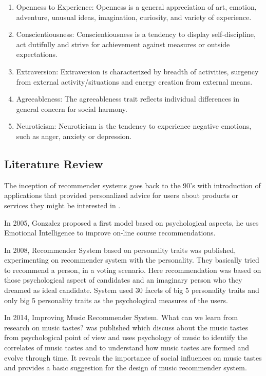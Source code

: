 \documentclass[conference]{IEEEtran}
\begin{document}
\begin{enumerate}
\item Openness to Experience: Openness is a general appreciation of art, emotion, adventure, unusual ideas, imagination, curiosity, and variety of experience.
\item Conscientiousness: Conscientiousness is a tendency to display self-discipline, act dutifully and strive for achievement against measures or outside expectations.
\item Extraversion: Extraversion is characterized by breadth of activities, surgency from external activity/situations and energy creation from external means.
\item Agreeableness: The agreeableness trait reflects individual differences in general concern for social harmony.
\item Neuroticism: Neuroticism is the tendency to experience negative emotions, such as anger, anxiety or depression.
\end{enumerate}

\subsection{Literature Review}
The inception of recommender systems goes back to the 90's with introduction of applications that provided personalized advice for users about products or services they might be interested in \cite{resnick}.

In 2005, Gonzalez \cite{gonzalez} proposed a first model based on psychological aspects, he uses Emotional Intelligence to improve on-line course recommendations.

In 2008, Recommender System based on personality traits \cite{nunes} was published, experimenting on recommender system with the personality. They basically tried to recommend a person, in a voting scenario. Here recommendation was based on those psychological aspect of candidates and an imaginary person who they dreamed as ideal candidate. System used 30 facets of big 5 personality traits and only big 5 personality traits as the psychological measures of the users.

In 2014, Improving Music Recommender System. What can we learn from research on music tastes? \cite{laplante} was published which discuss about the music tastes from psychological point of view and uses psychology of music to identify the correlates of music tastes and to understand how music tastes are formed and evolve through time. It reveals the importance of social influences on music tastes and provides a basic suggestion for the design of music recommender system.
\end{document}
